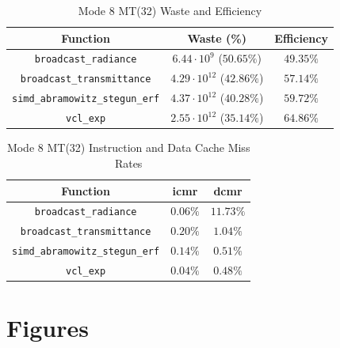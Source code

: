 \documentclass[a4paper, 11pt]{memoir}
\begin{document}
    \begin{table}[ht]
        \centering
        \begin{tabular}{|c|c|c|}
            \hline
            Function                                     & Waste (\%)                       & Efficiency\\\hline
            \texttt{broadcast_radiance}         & $6.44 \cdot 10^{9}$ ($50.65\%$)  & $49.35\%$\\
            \texttt{broadcast_transmittance}    & $4.29 \cdot 10^{12}$ ($42.86\%$) & $57.14\%$\\
            \texttt{simd_abramowitz_stegun_erf} & $4.37 \cdot 10^{12}$ ($40.28\%$) & $59.72\%$\\
            \texttt{vcl_exp}                    & $2.55 \cdot 10^{12}$ ($35.14\%$) & $64.86\%$\\
            \hline
        \end{tabular}
        \caption{Mode 8 MT(32) Waste and Efficiency}
        \label{tab:mode_8_mt_wae}
    \end{table}

    \begin{table}[ht]
        \centering
        \begin{tabular}{|c|c|c|}
            \hline
            Function                                     & icmr     & dcmr\\\hline
            \texttt{broadcast_radiance}         & $0.06\%$ & $11.73\%$\\
            \texttt{broadcast_transmittance}    & $0.20\%$ & $1.04\%$\\
            \texttt{simd_abramowitz_stegun_erf} & $0.14\%$ & $0.51\%$\\
            \texttt{vcl_exp}                    & $0.04\%$ & $0.48\%$\\
            \hline
        \end{tabular}
        \caption{Mode 8 MT(32) Instruction and Data Cache Miss Rates}
        \label{tab:mode_8_mt_cmr}
    \end{table}

    \chapter{Figures}
\end{document}
